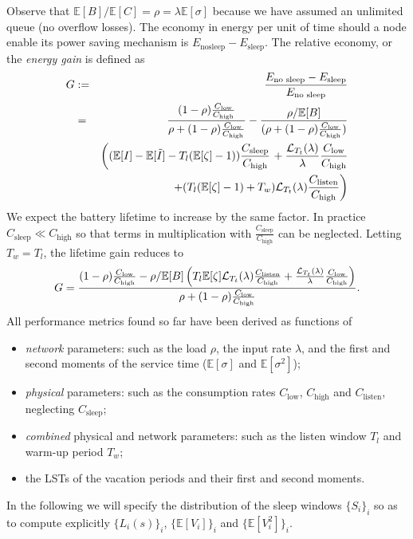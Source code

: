 \documentclass[journal]{IEEEtran}
\newcommand {\beq} {\begin{equation}}
\newcommand {\eeq} {\end{equation}}
\newcommand {\bear} {\begin{eqnarray}}
\newcommand {\eear} {\end{eqnarray}}
\def \E{{\mathbb E}}
\begin{document}
Observe that $\E[B]/\E[C]=\rho=\lambda\E[\sigma]$ because  we have assumed an unlimited queue (no overflow losses). The economy in energy per unit of time should a node enable its power saving mechanism is  $E_{\textrm{nosleep}}-E_{\textrm{sleep}}$. The relative economy, or the {\em
energy gain} is defined as 
\bear
\label{e:G-def}
G&:=&\frac{E_{\textrm{no sleep}}-E_{\textrm{sleep}}}{E_{\textrm{no sleep}}} \\
\nonumber&=&
\frac{(1-\rho)\frac{C_{\textrm{low}}}{C_{\textrm{high}}}}{\rho+(1-\rho)\frac{C_{\textrm{low}}}{C_{\textrm{high}}}}
-\frac{\rho/\E[B]}{({\rho+(1-\rho)\frac{C_{\textrm{low}}}{C_{\textrm{high}}}})}\\
&&
\left((\E[I]-\E[\tilde{I}]-{T_l(\E[\zeta]-1)})\frac{C_{\textrm{sleep}}}{C_{\textrm{high}}}\right.
\nonumber +\frac{{\cal L}_{T_t}(\lambda)}{\lambda}
\frac{C_{\textrm{low}}}{C_{\textrm{high}}}\\
&&\left.+({T_l(\E[\zeta]-1)}+T_w){\cal L}_{T_t}(\lambda)
\frac{C_{\textrm{listen}}}{C_{\textrm{high}}}
\right)
\eear We expect the battery lifetime to
increase by the same factor.
In practice $C_{\textrm{sleep}}\ll C_{\textrm{high}}$ so that
terms in multiplication with $\frac{C_{\textrm{sleep}}}{C_{\textrm{high}}}$ can be
neglected. Letting $T_w=T_l$, the lifetime gain reduces to
\beq
\label{e:G}
G=\frac{{(1-\rho)\frac{C_{\textrm{low}}}{C_{\textrm{high}}}-\rho/\E[B]
\left({T_l\E[\zeta]}{\cal L}_{T_t}(\lambda)\frac{C_{\textrm{listen}}}{C_{\textrm{high}}}+\frac{{\cal L}_{T_t}(\lambda)}{\lambda}\frac{C_{\textrm{low}}}{C_{\textrm{high}}}\right)} }{\rho+(1-\rho)\frac{C_{\textrm{low}}}{C_{\textrm{high}}}}.
\eeq
All performance metrics found so far have been derived as
functions of
\begin{itemize}
\item {\em network} parameters: such as the load $\rho$, the input rate
$\lambda$, and the first and second moments of the service time ($\E[\sigma]$
and $\E[\sigma^2]$);
\item {\em physical} parameters: such as the consumption rates
$C_{\textrm{low}}$, $C_{\textrm{high}}$ and $C_{\textrm{listen}}$,
neglecting $C_{\textrm{sleep}}$;
\item {\em combined} physical and network parameters: such as the
listen window $T_l$ and warm-up period $T_w$;
\item the LSTs of the vacation periods and their first and second
moments.
\end{itemize}
In the following we will specify the distribution of the sleep
windows $\{S_i\}_i$ so as to compute explicitly $\{L_i(s)\}_i$, $\{\E[V_i]\}_i$
and $\{\E[V_i^2]\}_i$.
\end{document}
